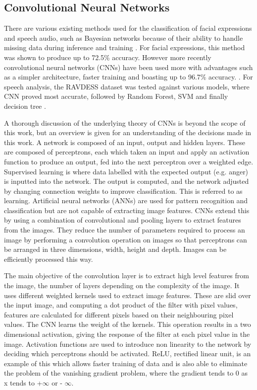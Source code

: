 \documentclass[12pt,a4paper]{article}
\begin{document}
\subsection{Convolutional Neural Networks}
There are various existing methods used for the classification of facial expressions and speech audio, such as Bayesian networks because of their ability to handle missing data during inference and training \cite{cohen2003learning}. For facial expressions, this method was shown to produce up to 72.5\% accuracy. However more recently convolutional neural networks (CNNs) have been used more with advantages such as a simpler architecture, faster training and boasting up to 96.7\% accuracy. \cite{LOPES2017610}. For speech analysis, the RAVDESS \cite{livingstone2018ryerson} dataset was tested against various models, where CNN proved most accurate, followed by Random Forest, SVM and finally decision tree \cite{christy2020multimodal}. 

A thorough discussion of the underlying theory of CNNs is beyond the scope of this work, but an overview is given for an understanding of the decisions made in this work. A network is composed of an input, output and hidden layers. These are composed of perceptrons, each which taken an input and apply an activation function to produce an output, fed into the next perceptron over a weighted edge. Supervised learning is where data labelled with the expected output (e.g. anger) is inputted into the network. The output is computed, and the network adjusted by changing connection weights to improve classification. This is referred to as learning. Artificial neural networks (ANNs) are used for pattern recognition and classification but are not capable of extracting image features. CNNs extend this by using a combination of convolutional and pooling layers to extract features from the images. They reduce the number of parameters required to process an image by performing a convolution operation on images so that perceptrons can be arranged in three dimensions, width, height and depth. Images can be efficiently processed this way.

The main objective of the convolution layer is to extract high level features from the image, the number of layers depending on the complexity of the image. It uses different weighted kernels used to extract image features. These are slid over the input image, and computing a dot product of the filter with pixel values, features are calculated for different pixels based on their neighbouring pixel values. The CNN learns the weight of the kernels. This operation results in a two dimensional activation, giving the response of the filter at each pixel value in the image. Activation functions are used to introduce non linearity to the network by deciding which perceptrons should be activated. ReLU, rectified linear unit, is an example of this which allows faster training of data and is also able to eliminate the problem of the vanishing gradient problem, where the gradient tends to 0 as x tends to +$\infty$ or - $\infty$.
\end{document}
